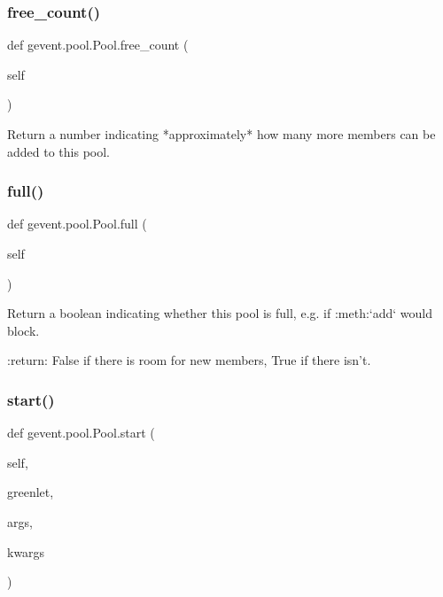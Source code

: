 \subsubsection{\texorpdfstring{free\+\_\+count()}{free\_count()}}
{\footnotesize\ttfamily def gevent.\+pool.\+Pool.\+free\+\_\+count (\begin{DoxyParamCaption}\item[{}]{self }\end{DoxyParamCaption})}

\begin{DoxyVerb}Return a number indicating *approximately* how many more members
can be added to this pool.
\end{DoxyVerb}
 \mbox{\label{classgevent_1_1pool_1_1_pool_a1e557c08dca29d3aefa26737b8aa83e3}} 
\subsubsection{\texorpdfstring{full()}{full()}}
{\footnotesize\ttfamily def gevent.\+pool.\+Pool.\+full (\begin{DoxyParamCaption}\item[{}]{self }\end{DoxyParamCaption})}

\begin{DoxyVerb}Return a boolean indicating whether this pool is full, e.g. if
:meth:`add` would block.

:return: False if there is room for new members, True if there isn't.
\end{DoxyVerb}
 \mbox{\label{classgevent_1_1pool_1_1_pool_a796a9ecd340aa63e7adbfbbf64aa811d}} 
\subsubsection{\texorpdfstring{start()}{start()}}
{\footnotesize\ttfamily def gevent.\+pool.\+Pool.\+start (\begin{DoxyParamCaption}\item[{}]{self,  }\item[{}]{greenlet,  }\item[{}]{args,  }\item[{}]{kwargs }\end{DoxyParamCaption})}

